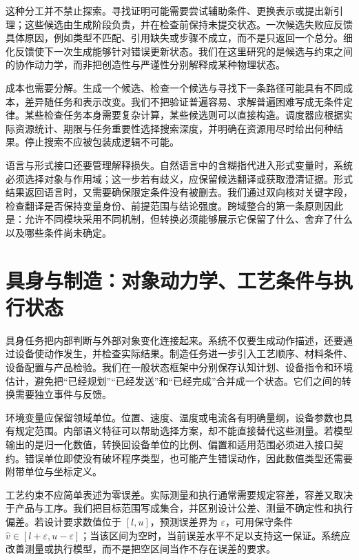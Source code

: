 这种分工并不禁止探索。寻找证明可能需要尝试辅助条件、更换表示或提出新引理；这些候选由生成阶段负责，并在检查前保持未提交状态。一次候选失败应反馈具体原因，例如类型不匹配、引用缺失或步骤不成立，而不是只返回一个总分。细化反馈使下一次生成能够针对错误更新状态。我们在这里研究的是候选与约束之间的协作动力学，而非把创造性与严谨性分别解释成某种物理状态。

成本也需要分解。生成一个候选、检查一个候选与寻找下一条路径可能具有不同成本，差异随任务和表示改变。我们不把验证普遍容易、求解普遍困难写成无条件定律。某些检查任务本身需要复杂计算，某些候选则可以直接构造。调度器应根据实际资源统计、期限与任务重要性选择搜索深度，并明确在资源用尽时给出何种结果。停止搜索不应被包装成逻辑不可能。

语言与形式接口还要管理解释损失。自然语言中的含糊指代进入形式变量时，系统必须选择对象与作用域；这一步若有歧义，应保留候选翻译或获取澄清证据。形式结果返回语言时，又需要确保限定条件没有被删去。我们通过双向核对关键字段，检查翻译是否保持变量身份、前提范围与结论强度。跨域整合的第一条原则因此是：允许不同模块采用不同机制，但转换必须能够展示它保留了什么、舍弃了什么以及哪些条件尚未确定。

\section{具身与制造：对象动力学、工艺条件与执行状态}
\label{sec:manifold_of_physics}
\label{sec:manifold_of_industry}

具身任务把内部判断与外部对象变化连接起来。系统不仅要生成动作描述，还要通过设备使动作发生，并检查实际结果。制造任务进一步引入工艺顺序、材料条件、设备配置与产品检验。我们在一般状态框架中分别保存认知计划、设备指令和环境估计，避免把“已经规划”“已经发送”和“已经完成”合并成一个状态。它们之间的转换需要独立事件与反馈。

环境变量应保留领域单位。位置、速度、温度或电流各有明确量纲，设备参数也具有规定范围。内部语义特征可以帮助选择方案，却不能直接替代这些测量。若模型输出的是归一化数值，转换回设备单位的比例、偏置和适用范围必须进入接口契约。错误单位即使没有破坏程序类型，也可能产生错误动作，因此数值类型还需要附带单位与坐标定义。

工艺约束不应简单表述为零误差。实际测量和执行通常需要规定容差，容差又取决于产品与工序。我们把目标范围写成集合，并区别设计公差、测量不确定性和执行偏差。若设计要求数值位于 $[l,u]$，预测误差界为 $\varepsilon$，可用保守条件 $\widehat v\in[l+\varepsilon,u-\varepsilon]$；当该区间为空时，当前误差水平不足以支持这一保证。系统应改善测量或执行模型，而不是把空区间当作不存在误差的要求。

